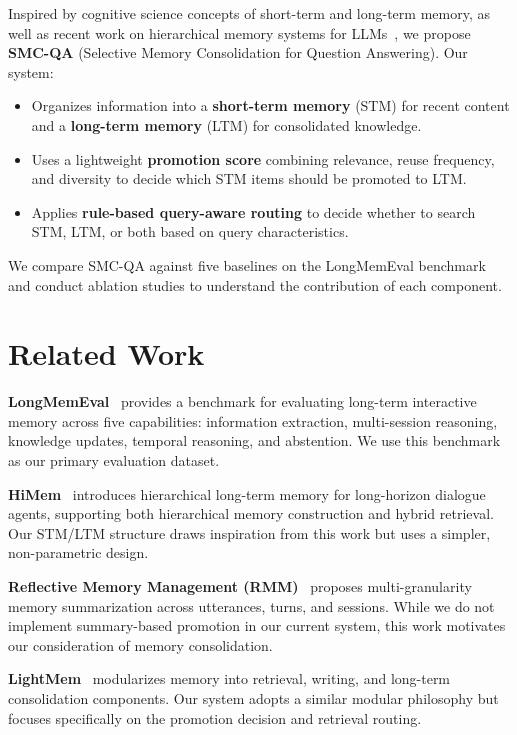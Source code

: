 \documentclass{article}
\begin{document}
Inspired by cognitive science concepts of short-term and long-term memory, as well as recent work on hierarchical memory systems for LLMs~\cite{himem, rmm, lightmem}, we propose \textbf{SMC-QA} (Selective Memory Consolidation for Question Answering). Our system:

\begin{itemize}
    \item Organizes information into a \textbf{short-term memory} (STM) for recent content and a \textbf{long-term memory} (LTM) for consolidated knowledge.
    \item Uses a lightweight \textbf{promotion score} combining relevance, reuse frequency, and diversity to decide which STM items should be promoted to LTM.
    \item Applies \textbf{rule-based query-aware routing} to decide whether to search STM, LTM, or both based on query characteristics.
\end{itemize}

We compare SMC-QA against five baselines on the LongMemEval benchmark~\cite{longmemeval} and conduct ablation studies to understand the contribution of each component.

\section{Related Work}

\textbf{LongMemEval}~\cite{longmemeval} provides a benchmark for evaluating long-term interactive memory across five capabilities: information extraction, multi-session reasoning, knowledge updates, temporal reasoning, and abstention. We use this benchmark as our primary evaluation dataset.

\textbf{HiMem}~\cite{himem} introduces hierarchical long-term memory for long-horizon dialogue agents, supporting both hierarchical memory construction and hybrid retrieval. Our STM/LTM structure draws inspiration from this work but uses a simpler, non-parametric design.

\textbf{Reflective Memory Management (RMM)}~\cite{rmm} proposes multi-granularity memory summarization across utterances, turns, and sessions. While we do not implement summary-based promotion in our current system, this work motivates our consideration of memory consolidation.

\textbf{LightMem}~\cite{lightmem} modularizes memory into retrieval, writing, and long-term consolidation components. Our system adopts a similar modular philosophy but focuses specifically on the promotion decision and retrieval routing.
\end{document}
